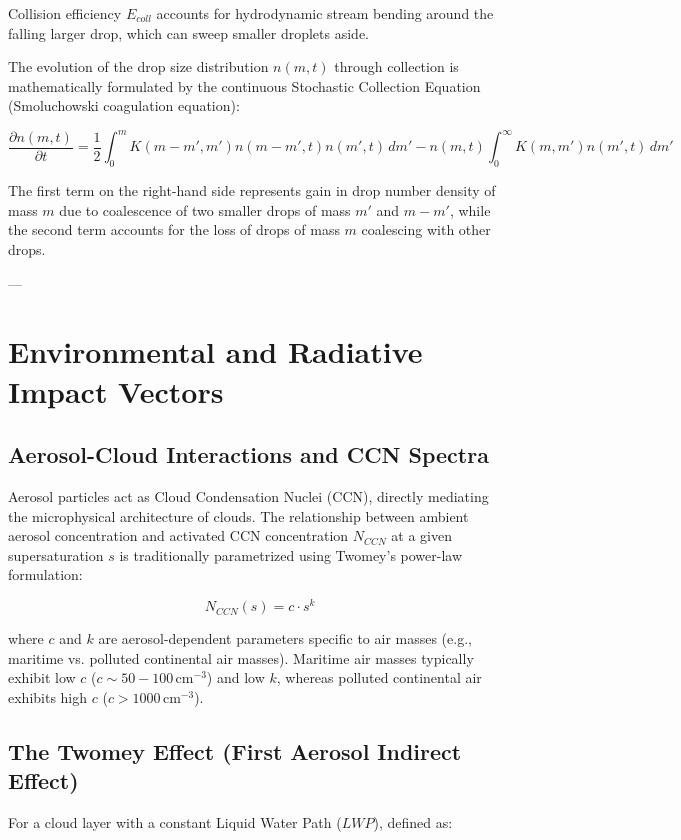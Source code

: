 \documentclass[12pt]{article}
\begin{document}
Collision efficiency $E_{coll}$ accounts for hydrodynamic stream bending around the falling larger drop, which can sweep smaller droplets aside. 

The evolution of the drop size distribution $n(m, t)$ through collection is mathematically formulated by the continuous Stochastic Collection Equation (Smoluchowski coagulation equation):

\begin{equation}
\frac{\partial n(m, t)}{\partial t} = \frac{1}{2} \int_{0}^{m} K(m - m', m') n(m - m', t) n(m', t) \, dm' - n(m, t) \int_{0}^{\infty} K(m, m') n(m', t) \, dm'
\end{equation}

The first term on the right-hand side represents gain in drop number density of mass $m$ due to coalescence of two smaller drops of mass $m'$ and $m - m'$, while the second term accounts for the loss of drops of mass $m$ coalescing with other drops.

---

\section{Environmental and Radiative Impact Vectors}

\subsection{Aerosol-Cloud Interactions and CCN Spectra}
Aerosol particles act as Cloud Condensation Nuclei (CCN), directly mediating the microphysical architecture of clouds. The relationship between ambient aerosol concentration and activated CCN concentration $N_{CCN}$ at a given supersaturation $s$ is traditionally parametrized using Twomey’s power-law formulation:

\begin{equation}
N_{CCN}(s) = c \cdot s^k
\end{equation}

where $c$ and $k$ are aerosol-dependent parameters specific to air masses (e.g., maritime vs. polluted continental air masses). Maritime air masses typically exhibit low $c$ ($c \sim 50-100\,\text{cm}^{-3}$) and low $k$, whereas polluted continental air exhibits high $c$ ($c > 1000\,\text{cm}^{-3}$).

\subsection{The Twomey Effect (First Aerosol Indirect Effect)}
For a cloud layer with a constant Liquid Water Path ($LWP$), defined as:
\end{document}
